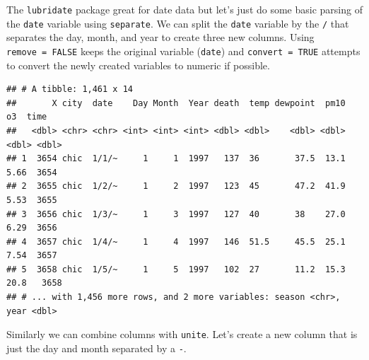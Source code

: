 \documentclass[
]{book}
\newenvironment{Shaded}{\begin{snugshade}}{\end{snugshade}}
\newcommand{\DataTypeTok}[1]{\textcolor[rgb]{0.13,0.29,0.53}{#1}}
\newcommand{\KeywordTok}[1]{\textcolor[rgb]{0.13,0.29,0.53}{\textbf{#1}}}
\newcommand{\NormalTok}[1]{#1}
\newcommand{\OperatorTok}[1]{\textcolor[rgb]{0.81,0.36,0.00}{\textbf{#1}}}
\newcommand{\OtherTok}[1]{\textcolor[rgb]{0.56,0.35,0.01}{#1}}
\newcommand{\StringTok}[1]{\textcolor[rgb]{0.31,0.60,0.02}{#1}}
\theoremstyle{definition}
\theoremstyle{definition}
\theoremstyle{definition}
\theoremstyle{remark}
\begin{document}
The \texttt{lubridate} package great for date data but let's just do some basic parsing of the \texttt{date} variable using \texttt{separate}. We can split the \texttt{date} variable by the \texttt{/} that separates the day, month, and year to create three new columns. Using \texttt{remove\ =\ FALSE} keeps the original variable (\texttt{date}) and \texttt{convert\ =\ TRUE} attempts to convert the newly created variables to numeric if possible.

\begin{Shaded}
\end{Shaded}

\begin{verbatim}
## # A tibble: 1,461 x 14
##       X city  date    Day Month  Year death  temp dewpoint  pm10    o3  time
##   <dbl> <chr> <chr> <int> <int> <int> <dbl> <dbl>    <dbl> <dbl> <dbl> <dbl>
## 1  3654 chic  1/1/~     1     1  1997   137  36       37.5  13.1  5.66  3654
## 2  3655 chic  1/2/~     1     2  1997   123  45       47.2  41.9  5.53  3655
## 3  3656 chic  1/3/~     1     3  1997   127  40       38    27.0  6.29  3656
## 4  3657 chic  1/4/~     1     4  1997   146  51.5     45.5  25.1  7.54  3657
## 5  3658 chic  1/5/~     1     5  1997   102  27       11.2  15.3 20.8   3658
## # ... with 1,456 more rows, and 2 more variables: season <chr>, year <dbl>
\end{verbatim}

Similarly we can combine columns with \texttt{unite}. Let's create a new column that is just the day and month separated by a \texttt{-}.

\begin{Shaded}
\end{Shaded}
\end{document}

